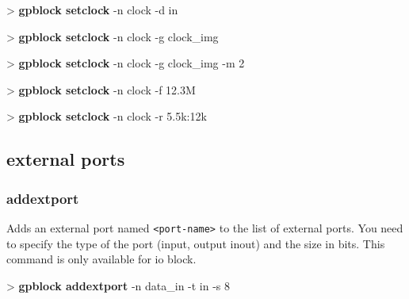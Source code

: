 \documentclass[10pt,a4paper]{article}
\begin{document}
\begin{sampletitle}
> \textbf{gpblock setclock} -n clock -d in
\end{sampletitle}

\begin{sampletitle}
> \textbf{gpblock setclock} -n clock -g clock\_img
\end{sampletitle}

\begin{sampletitle}
> \textbf{gpblock setclock} -n clock -g clock\_img -m 2
\end{sampletitle}

\begin{sampletitle}
> \textbf{gpblock setclock} -n clock -f 12.3M
\end{sampletitle}

\begin{sampletitle}
> \textbf{gpblock setclock} -n clock -r 5.5k:12k
\end{sampletitle}

\subsection{external ports}
\subsubsection{addextport}
\label{subsec:addextport}

Adds an external port named \texttt{<port-name>} to the list of external ports. You need to specify the type of the port (input, output inout) and the size in bits. This command is only available for io block.\\


\begin{sampletitle}
> \textbf{gpblock addextport} -n data\_in -t in -s 8
\end{sampletitle}
\end{document}
